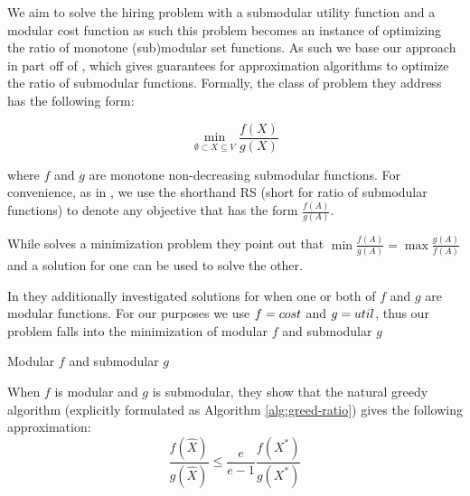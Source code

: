 We aim to solve the hiring problem with a submodular utility function and a modular cost function as such this problem becomes an instance of optimizing the ratio of monotone (sub)modular set functions. As such we base our approach in part off of \cite{bai2016algorithms}, which gives guarantees for approximation algorithms to optimize the ratio of submodular functions.
Formally, the class of problem they address has the following form:

\begin{problem}
	\label{prob:RS-min}
	\[ \underset{\emptyset \subset X \subseteq V}{\min} \frac{f(X)}{g(X)}
	\]
\end{problem}

where $ f $ and $ g $ are monotone non-decreasing submodular functions.
For convenience, as in \cite{bai2016algorithms}, we use the shorthand RS (short for ratio of submodular functions) to denote any objective that has the form $ \frac{f(A)}{g(A)} $.

While \cite{bai2016algorithms} solves a minimization problem they point out that $ \min \frac{f(A)}{g(A)} = \max \frac{g(A)}{f(A)} $ and a solution for one can be used to solve the other. 

In \cite{bai2016algorithms} they additionally investigated solutions for when one or both of $f$ and $g$ are modular functions. For our purposes we use $f=cost$ and $g={util}$, thus our problem falls into the minimization of modular $f$ and submodular $g$ 

\begin{property}
	\label{prop:mod-f-submod-g}
	Modular $ f $ and submodular $ g $
\end{property}

When $ f $ is modular and $ g $ is submodular, they show that the natural greedy algorithm (explicitly formulated as Algorithm \ref{alg:greed-ratio}) gives the following approximation:
\begin{equation}
	\label{eq:greedy-approx}
	\frac{f(\hat{X})}{g(\hat{X})} \leq \frac{e}{e - 1} \frac{f(X^*)}{g(X^*)}
\end{equation}
 

 
